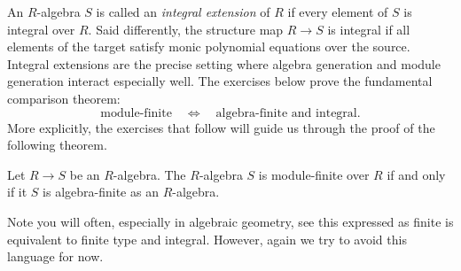 \documentclass[12pt,reqno]{amsart}
\begin{document}
\hrulefill

An $R$-algebra $S$ is called an \emph{integral extension} of $R$ if every element of $S$ is integral over $R$. Said differently, the structure map $R\to S$ is integral if all elements of the target satisfy monic polynomial equations over the source. Integral extensions are the precise setting where algebra generation and module generation interact especially well. The exercises below prove the fundamental comparison theorem:
\[
\boxed{\text{module-finite}}\quad \Longleftrightarrow\quad \boxed{\text{algebra-finite and integral}}.
\]
More explicitly, the exercises that follow will guide us through the proof of the following theorem. 

\begin{theorem}
Let $R\to S$ be an $R$-algebra.  The  $R$-algebra $S$ is module-finite over $R$ if and only if it $S$ is algebra-finite as an $R$-algebra. 
\end{theorem}

Note you will often, especially in algebraic geometry, see this expressed as finite is equivalent to finite type and integral. However, again we try to avoid this language for now. 

\hrulefill
\end{document}
